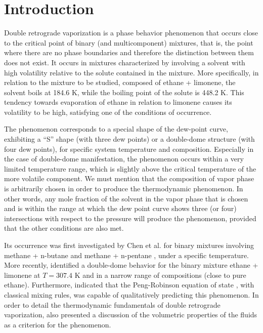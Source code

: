 \documentclass[journal=iecred,manuscript=article]{achemso}
\theoremstyle{definition}
\theoremstyle{remark}
\begin{document}
\section{Introduction}

Double retrograde vaporization is a phase behavior phenomenon that occurs close to the critical point of binary (and multicomponent) mixtures, that is, the point where there are no phase boundaries and therefore the distinction between them does not exist. It occurs in mixtures characterized by involving a solvent with high volatility relative to the solute contained in the mixture. More specifically, in relation to the mixture to be studied, composed of ethane + limonene, the solvent boils at 184.6 K, while the boiling point of the solute is 448.2 K. This tendency towards evaporation of ethane in relation to limonene causes its volatility to be high, satisfying one of the conditions of occurrence.

The phenomenon corresponds to a special shape of the dew-point curve, exhibiting a \enquote{S} shape (with three dew points) or a double-dome structure (with four dew points), for specific system temperature and composition. Especially in the case of double-dome manifestation, the phenomenon occurs within a very limited temperature range, which is slightly above the critical temperature of the more volatile component. We must mention that the composition of vapor phase is arbitrarily chosen in order to produce the thermodynamic phenomenon. In other words, any mole fraction of the solvent in the vapor phase that is chosen and is within the range at which the dew point curve shows three (or four) intersections with respect to the pressure will produce the phenomenon, provided that the other conditions are also met.

Its occurrence was first investigated by Chen et al. for binary mixtures involving methane + n-butane \cite{chen_1} and methane + n-pentane \cite{chen_2}, under a specific temperature. More recently, \citet{raeissi_1} identified a double-dome behavior for the binary mixture ethane + limonene at $T = 307.4$ K and in a narrow range of compositions (close to pure ethane). Furthermore, \citet{raeissi_2} indicated that the Peng-Robinson equation of state \citep{peng_robinson}, with classical mixing rules, was capable of qualitatively predicting this phenomenon. In order to detail the thermodynamic fundamentals of double retrograde vaporization, \citet{raeissi2004thermodynamic} also presented a discussion of the volumetric properties of the fluids as a criterion for the phenomenon. 
\end{document}
